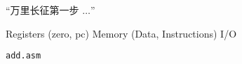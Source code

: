 
\begin{frame}{}
  \begin{center}

    \vspace{0.50cm}
    ``万里长征第一步 $\ldots$''
  \end{center}
\end{frame}

\begin{frame}{}
\end{frame}

\begin{frame}{}
\end{frame}

\begin{frame}{}
  \begin{center}
    Registers (zero, pc) \quad Memory (Data, Instructions) \quad I/O
  \end{center}
\end{frame}

\begin{frame}{}
  \begin{center}
    {\Large \texttt{add.asm}}

    \pause
    \vspace{1.00cm}

    \pause
    \vspace{1.00cm}
  \end{center}
\end{frame}

\begin{frame}{}
  \begin{center}
  \end{center}
\end{frame}

\begin{frame}{}
  \begin{center}

    \vspace{0.60cm}
  \end{center}
\end{frame}


